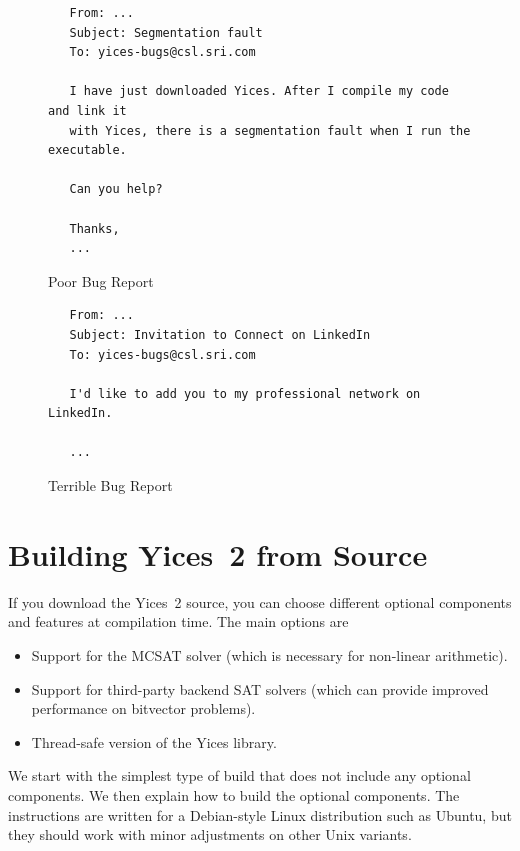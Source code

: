 \documentclass[11pt,twoside,fleqn,openright,titlepage]{cslreport}
\begin{document}
\begin{figure}
\begin{center}
\begin{footnotesize}
\begin{verbatim}
   From: ...
   Subject: Segmentation fault
   To: yices-bugs@csl.sri.com

   I have just downloaded Yices. After I compile my code and link it
   with Yices, there is a segmentation fault when I run the executable.

   Can you help?

   Thanks,
   ...
\end{verbatim}
\end{footnotesize}
\end{center}
\caption{Poor Bug Report}
\label{bad-report}
\end{figure}

\begin{figure}
\begin{center}
\begin{footnotesize}
\begin{verbatim}
   From: ...
   Subject: Invitation to Connect on LinkedIn
   To: yices-bugs@csl.sri.com

   I'd like to add you to my professional network on LinkedIn.

   ...
\end{verbatim}
\end{footnotesize}
\end{center}
\caption{Terrible Bug Report}
\label{terrible-report}
\end{figure}



\chapter{Building Yices~2 from Source}
\label{compilation}

If you download the Yices~2 source, you can choose different optional
components and features at compilation time. The main options are
\begin{itemize}
\item Support for the MCSAT solver (which is necessary for non-linear arithmetic).
\item Support for third-party backend SAT solvers (which can provide improved performance on bitvector problems).
\item Thread-safe version of the Yices library.
\end{itemize}
We start with the simplest type of build that does not include any
optional components.  We then explain how to build the optional
components.  The instructions are written for a Debian-style Linux
distribution such as Ubuntu, but they should work with minor
adjustments on other Unix variants.
\end{document}
